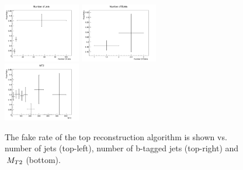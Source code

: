\begin{figure}[htbp] 
\centering
    \includegraphics[width=0.3\textwidth]{figs/top_fake_NJets.png}
    \includegraphics[width=0.3\textwidth]{figs/top_fake_NBJets.png} \\
    \includegraphics[width=0.3\textwidth]{figs/top_fake_MT2.png}
    \caption{The fake rate of the top reconstruction algorithm is shown vs. number of jets (top-left), number
of b-tagged jets (top-right) and $\,{M_{T2}}$ (bottom).}
    \label{figtopref_fake}
\end{figure}
